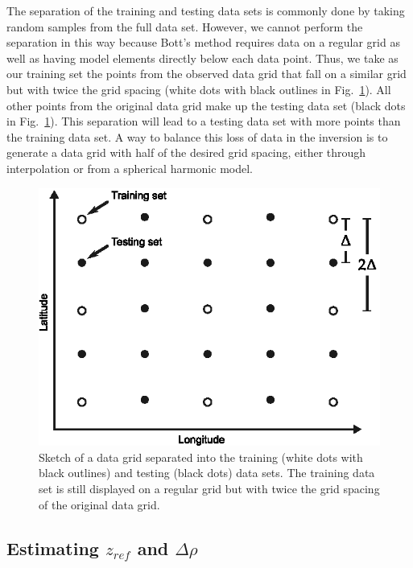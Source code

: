 \documentclass[extra]{gji}
\begin{document}
The separation of the training and testing data sets is commonly done by taking
random samples from the full data set.
However, we cannot perform the separation in this way because
Bott's method requires data on a regular grid as well as having model elements
directly below each data point.
Thus, we take as our training set the points from the observed data grid that
fall on a similar grid but with twice the grid spacing
(white dots with black outlines in Fig.~\ref{fig:grid_separation}).
All other points from the original data grid
make up the testing data set
(black dots in Fig.~\ref{fig:grid_separation}).
This separation will lead to
a testing data set with more points than the training data set.
A way to balance this loss of data in the inversion
is to generate a data grid with half of the desired grid spacing,
either through interpolation
or from a spherical harmonic model.


\begin{figure}
    \centering
    \includegraphics{figures/cv-grid-separation}
    \caption{Sketch of a data grid separated into
        the training (white dots with black outlines)
        and testing (black dots) data sets.
        The training data set is still displayed on a regular grid
        but with twice the grid spacing
        of the original data grid.}
    \label{fig:grid_separation}
\end{figure}



\subsection{Estimating $z_{ref}$ and $\Delta\rho$}
\end{document}
